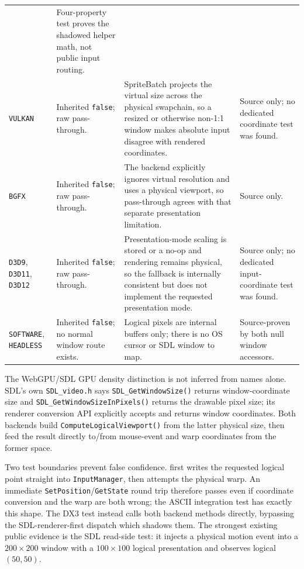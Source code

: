 \begin{longtable}{@{}p{}p{}p{}p{}@{}}
  & Four-property test proves the shadowed helper math, not public input routing. \\
\texttt{VULKAN}
  & Inherited \texttt{false}; raw pass-through.
  & SpriteBatch projects the virtual size across the physical swapchain, so a resized or
    otherwise non-1:1 window makes absolute input disagree with rendered coordinates.
  & Source only; no dedicated coordinate test was found. \\
\texttt{BGFX}
  & Inherited \texttt{false}; raw pass-through.
  & The backend explicitly ignores virtual resolution and uses a physical viewport, so
    pass-through agrees with that separate presentation limitation.
  & Source only. \\
\texttt{D3D9}, \texttt{D3D11}, \texttt{D3D12}
  & Inherited \texttt{false}; raw pass-through.
  & Presentation-mode scaling is stored or a no-op and rendering remains physical, so the
    fallback is internally consistent but does not implement the requested presentation mode.
  & Source only; no dedicated input-coordinate test was found. \\
\texttt{SOFTWARE}, \texttt{HEADLESS}
  & Inherited \texttt{false}; no normal window route exists.
  & Logical pixels are internal buffers only; there is no OS cursor or SDL window to map.
  & Source-proven by both null window accessors. \\
\bottomrule
\end{longtable}
\endgroup

The WebGPU/SDL GPU density distinction is not inferred from names alone. SDL's own
\texttt{SDL\_video.h} says \texttt{SDL\_GetWindow\allowbreak Size()} returns
window-coordinate size and
\texttt{SDL\_GetWindow\allowbreak SizeInPixels()} returns the drawable pixel size; its
renderer conversion API explicitly accepts and returns window coordinates. Both backends
build \texttt{ComputeLogical\allowbreak Viewport()} from the latter physical size, then feed
the result directly to/from mouse-event and warp coordinates from the former space.

Two test boundaries prevent false confidence.  first writes the
requested logical point straight into \texttt{InputManager}, then attempts the physical warp.
An immediate \texttt{SetPosition}/\texttt{GetState} round trip therefore passes even if
coordinate conversion and the warp are both wrong; the ASCII integration test has exactly
this shape. The DX3 test instead calls both backend methods directly, bypassing the
SDL-renderer-first dispatch which shadows them. The strongest existing public evidence is the
SDL read-side test: it injects a physical motion event into a $200\times200$ window with a
$100\times100$ logical presentation and observes logical $(50,50)$.

